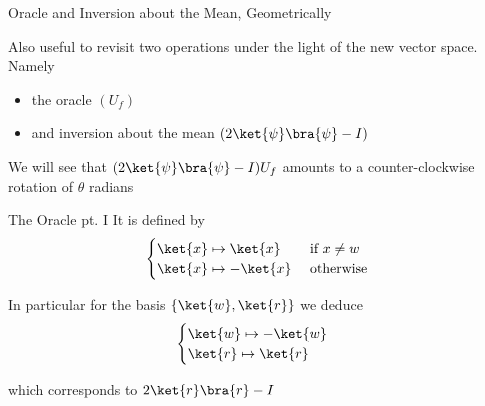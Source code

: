 \documentclass{beamer}
\begin{document}
\begin{frame}{Oracle and Inversion about the Mean, Geometrically}

       Also useful to revisit two operations under the light of the new vector
       space. Namely
       \begin{itemize}
               \item the oracle $(U_f)$
               \item and inversion about the mean $(2\ket{\psi}\bra{\psi} - I)$
       \end{itemize}
       

       \pause
       We will see that $(2\ket{\psi}\bra{\psi} - I) U_f$ amounts to a
       \alert{counter-clockwise rotation} of \alert{$\theta$} radians

\end{frame}

\begin{frame}{The Oracle pt. I}
        It is defined by
        \[
                \begin{cases}
                        \ket{x} \mapsto \ket{x} & \text{ if } x \not = w \\
                        \ket{x} \mapsto - \ket{x} & \text{ otherwise }
                \end{cases}
        \]

        In particular for the basis $\{\ket{w},\ket{r}\}$ we deduce
        \[
                \begin{cases}
                        \ket{w} \mapsto -\ket{w} \\
                        \ket{r} \mapsto \ket{r}
                \end{cases}
        \]

        which corresponds to \alert{$2\ket{r}\bra{r} - I$}
\end{frame}

\usetikzlibrary{angles, arrows.meta, quotes}
\end{document}
